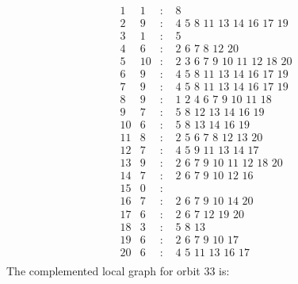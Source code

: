 \documentclass[12pt]{article}
\begin{document}
\begin{equation*}
\begin{array}{rrcl}
1&1&:&\,\,8\\
2&9&:&\,\,4\,\,5\,\,8\,\,11\,\,13\,\,14\,\,16\,\,17\,\,19\\
3&1&:&\,\,5\\
4&6&:&\,\,2\,\,6\,\,7\,\,8\,\,12\,\,20\\
5&10&:&\,\,2\,\,3\,\,6\,\,7\,\,9\,\,10\,\,11\,\,12\,\,18\,\,20\\
6&9&:&\,\,4\,\,5\,\,8\,\,11\,\,13\,\,14\,\,16\,\,17\,\,19\\
7&9&:&\,\,4\,\,5\,\,8\,\,11\,\,13\,\,14\,\,16\,\,17\,\,19\\
8&9&:&\,\,1\,\,2\,\,4\,\,6\,\,7\,\,9\,\,10\,\,11\,\,18\\
9&7&:&\,\,5\,\,8\,\,12\,\,13\,\,14\,\,16\,\,19\\
10&6&:&\,\,5\,\,8\,\,13\,\,14\,\,16\,\,19\\
11&8&:&\,\,2\,\,5\,\,6\,\,7\,\,8\,\,12\,\,13\,\,20\\
12&7&:&\,\,4\,\,5\,\,9\,\,11\,\,13\,\,14\,\,17\\
13&9&:&\,\,2\,\,6\,\,7\,\,9\,\,10\,\,11\,\,12\,\,18\,\,20\\
14&7&:&\,\,2\,\,6\,\,7\,\,9\,\,10\,\,12\,\,16\\
15&0&:&\\
16&7&:&\,\,2\,\,6\,\,7\,\,9\,\,10\,\,14\,\,20\\
17&6&:&\,\,2\,\,6\,\,7\,\,12\,\,19\,\,20\\
18&3&:&\,\,5\,\,8\,\,13\\
19&6&:&\,\,2\,\,6\,\,7\,\,9\,\,10\,\,17\\
20&6&:&\,\,4\,\,5\,\,11\,\,13\,\,16\,\,17\\
\end{array}
\end{equation*}
The complemented local graph for orbit $33$ is:
\end{document}
